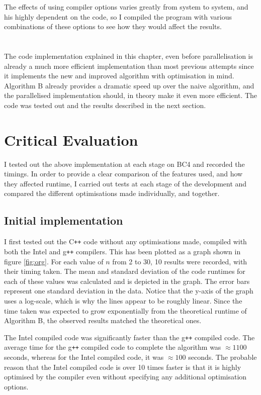 \documentclass[ %
                    author={Manan Vaswani},
                supervisor={Dr. Raphael Clifford},
                    degree={MEng},
                     title={A multi-core CPU implementation of the classical Boson Sampling algorithm},
                  subtitle={},
                      type={},
                      year={2019} ]{dissertation}
\theoremstyle{plain}
\theoremstyle{definition}
\begin{document}
The effects of using compiler options varies greatly from system to system, and his highly dependent on the code, so I compiled the program with various combinations of these options to see how they would affect the results.
\\
\\
\\
The code implementation explained in this chapter, even before parallelisation is already a much more efficient implementation than most previous attempts since it implements the new and improved algorithm with optimisation in mind. Algorithm B already provides a dramatic speed up over the naive algorithm, and the parallelised implementation should, in theory make it even more efficient. The code was tested out and the results described in the next section.

\chapter{Critical Evaluation}
\label{chap:evaluation}

I tested out the above implementation at each stage on BC4 and recorded the timings. In order to provide a clear comparison of the features used, and how they affected runtime, I carried out tests at each stage of the development and compared the different optimisations made individually, and together.


\section{Initial implementation}
I first tested out the C\texttt{++} code without any optimisations made, compiled with both the Intel and g\texttt{++} compilers. This has been plotted as a graph shown in figure \ref{fig:org}. For each value of $n$ from 2 to 30, 10 results were recorded, with their timing taken. The mean and standard deviation of the code runtimes for each of these values was calculated and is depicted in the graph. The error bars represent one standard deviation in the data. Notice that the y-axis of the graph uses a log-scale, which is why the lines appear to be roughly linear. Since the time taken was expected to grow exponentially from the theoretical runtime of Algorithm B, the observed results matched the theoretical ones. 

The Intel compiled code was significantly faster than the g\texttt{++} compiled code. The average time for the g\texttt{++} compiled code to complete the algorithm was $\approx1100$ seconds, whereas for the Intel compiled code, it was $\approx100$ seconds. The probable reason that the Intel compiled code is over 10 times faster is that it is highly optimised by the compiler even without specifying any additional optimisation options.
\end{document}
